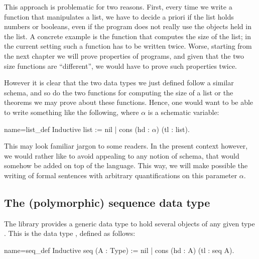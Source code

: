 This approach is problematic for two reasons.  First, every time we
write a function that manipulates a list, we have to decide a priori
if the list holds numbers or booleans, even if the program does not
really use the objects held in the list.
A concrete example is the function that computes the size of the list;
in the current setting such a function has to be written twice.
Worse, starting from the next chapter we will prove properties of programs,
and given that the two size functions are ``different'', we would have
to prove such properties twice.

However it is clear that the two data types we just defined follow
a similar schema, and so do the two functions for computing the size of
a list
or the theorems we may prove about these functions.  Hence, one would
want to be able to write something
like the following, where $\alpha$ is a schematic variable:

\begin{coq}{name=list_def}{}
Inductive list := nil | cons (hd : $\alpha$) (tl : list).
\end{coq}

\noindent This may look familiar jargon to some readers. In the
present context however, we would rather like to avoid appealing to
any notion of schema, that would somehow be added on top of the
\Coq{} language. This way, we will make possible the writing of
formal sentences with arbitrary quantifications on this parameter
$\alpha$.

%

\subsection{The (polymorphic) sequence data type}
\label{sec:sequence}

The \mcbMC{} library provides a generic data type to hold
several objects of any given type . This is the data type ,
defined as follows:

\begin{coq}{name=seq_def}{}
Inductive seq (A : Type) := nil | cons (hd : A) (tl : seq A).
\end{coq}


